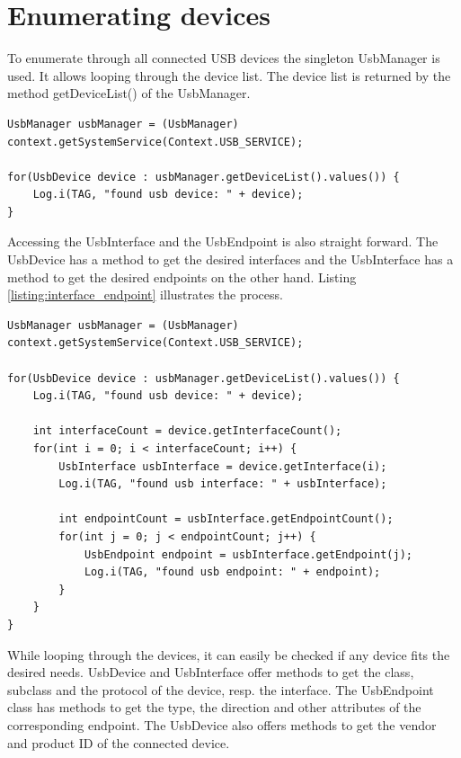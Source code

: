 \section{Enumerating devices}

To enumerate through all connected USB devices the singleton UsbManager is used. It allows looping through the device list. The device list is returned by the method getDeviceList() of the UsbManager.

\begin{lstlisting}[caption=Enumerating connected USB devices, label=listing:enumerate]
UsbManager usbManager = (UsbManager) context.getSystemService(Context.USB_SERVICE);
		
for(UsbDevice device : usbManager.getDeviceList().values()) {
	Log.i(TAG, "found usb device: " + device);
}
\end{lstlisting}

Accessing the UsbInterface and the UsbEndpoint is also straight forward. The UsbDevice has a method to get the desired interfaces and the UsbInterface has a method to get the desired endpoints on the other hand. Listing \ref{listing:interface_endpoint} illustrates the process.

\begin{lstlisting}[caption=Accessing UsbInterface and UsbEndpoint, label=listing:interface_endpoint]
UsbManager usbManager = (UsbManager) context.getSystemService(Context.USB_SERVICE);
		
for(UsbDevice device : usbManager.getDeviceList().values()) {
	Log.i(TAG, "found usb device: " + device);
	
	int interfaceCount = device.getInterfaceCount();
	for(int i = 0; i < interfaceCount; i++) {
		UsbInterface usbInterface = device.getInterface(i);
		Log.i(TAG, "found usb interface: " + usbInterface);
		
		int endpointCount = usbInterface.getEndpointCount();
		for(int j = 0; j < endpointCount; j++) {
			UsbEndpoint endpoint = usbInterface.getEndpoint(j);
			Log.i(TAG, "found usb endpoint: " + endpoint);
		}
	}
}
\end{lstlisting}

While looping through the devices, it can easily be checked if any device fits the desired needs. UsbDevice and UsbInterface offer methods to get the class, subclass and the protocol of the device, resp. the interface. The UsbEndpoint class has methods to get the type, the direction and other attributes of the corresponding endpoint. The UsbDevice also offers methods to get the vendor and product ID of the connected device.

